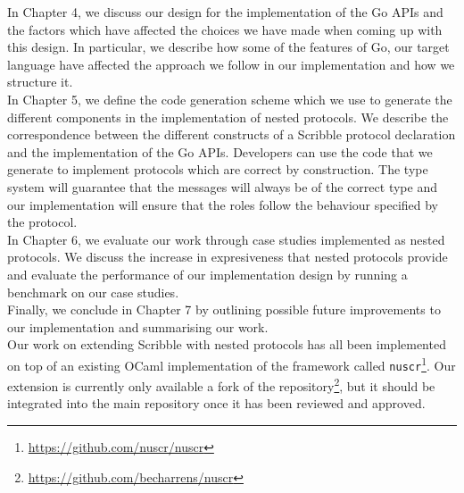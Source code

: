 \documentclass[12pt,twoside]{report}
\begin{document}
In Chapter 4, we discuss our design for the implementation of the Go APIs and the factors which have affected the choices we have made when coming up with this design. In particular, we describe how some of the features of Go, our target language have affected the approach we follow in our implementation and how we structure it.\\

In Chapter 5, we define the code generation scheme which we use to generate the different components in the implementation of nested protocols. We describe the correspondence between the different constructs of a Scribble protocol declaration and the implementation of the Go APIs. Developers can use the code that we generate to implement protocols which are correct by construction. The type system will guarantee that the messages will always be of the correct type and our implementation will ensure that the roles follow the behaviour specified by the protocol.\\

In Chapter 6, we evaluate our work through case studies implemented as nested protocols. We discuss the increase in expresiveness that nested protocols provide and evaluate the performance of our implementation design by running a benchmark on our case studies.\\

Finally, we conclude in Chapter 7 by outlining possible future improvements to our implementation and summarising our work.\\

Our work on extending Scribble with nested protocols has all been implemented on top of an existing OCaml implementation of the framework called \texttt{nuscr}\footnote{\href{https://github.com/nuscr/nuscr}{https://github.com/nuscr/nuscr}}. Our extension is currently only available a fork of the repository\footnote{\href{https://github.com/becharrens/nuscr}{https://github.com/becharrens/nuscr}}, but it should be integrated into the main repository once it has been reviewed and approved.

\end{document}
